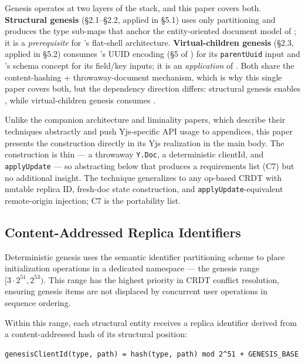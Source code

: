 Genesis operates at two layers of the stack, and this paper covers both. \textbf{Structural genesis} (\S2.1--\S2.2, applied in \S5.1) uses only partitioning\cite{plexus:partitioning} and produces the type sub-maps that anchor the entity-oriented document model of \cite{plexus:arch}; it is a \emph{prerequisite} for \cite{plexus:arch}'s flat-shell architecture. \textbf{Virtual-children genesis} (\S2.3, applied in \S5.2) consumes \cite{plexus:arch}'s UUID encoding (\S5 of \cite{plexus:arch}) for its \texttt{parentUuid} input and \cite{plexus:arch}'s schema concept for its field/key inputs; it is an \emph{application} of \cite{plexus:arch}. Both share the content-hashing + throwaway-document mechanism, which is why this single paper covers both, but the dependency direction differs: structural genesis enables \cite{plexus:arch}, while virtual-children genesis consumes \cite{plexus:arch}.

Unlike the companion architecture\cite{plexus:arch} and liminality\cite{plexus:liminal} papers, which describe their techniques abstractly and push Yjs-specific API usage to appendices, this paper presents the construction directly in its Yjs realization in the main body. The construction is thin --- a throwaway \texttt{Y.Doc}, a deterministic clientId, and \texttt{applyUpdate} --- so abstracting below that produces a requirements list (C7) but no additional insight. The technique generalizes to any op-based CRDT with mutable replica ID, fresh-doc state construction, and \texttt{applyUpdate}-equivalent remote-origin injection; C7 is the portability list.

\subsection{Content-Addressed Replica Identifiers}

Deterministic genesis uses the semantic identifier partitioning scheme\cite{plexus:partitioning} to place initialization operations in a dedicated namespace --- the genesis range $[3\cdot 2^{51}, 2^{53})$. This range has the highest priority in CRDT conflict resolution, ensuring genesis items are not displaced by concurrent user operations in sequence ordering\cite{plexus:partitioning}.

Within this range, each structural entity receives a replica identifier derived from a content-addressed hash of its structural position:

\begin{lstlisting}
genesisClientId(type, path) = hash(type, path) mod 2^51 + GENESIS_BASE
\end{lstlisting}

